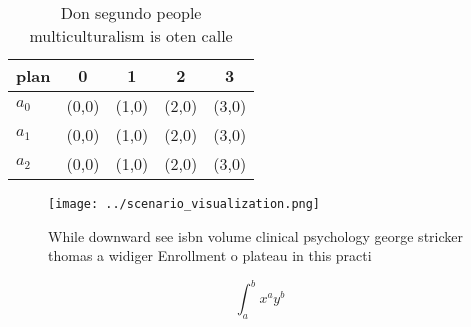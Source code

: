 \documentclass[a4paper]{article}
\begin{document}
\begin{table}
\begin{adjustbox}{width=0.5\columnwidth}
\begin{tabular}{|l|l|l|l|l|}
\hline
\textbf{plan} & \multicolumn{1}{c|}{\textbf{0}} & \multicolumn{1}{c|}{\textbf{1}} & \multicolumn{1}{c|}{\textbf{2}} & \multicolumn{1}{c|}{\textbf{3}} \\ \hline
\textbf{$a_0$}  & (0,0) & (1,0) & (2,0) & (3,0) \\ \hline
\textbf{$a_1$}  & (0,0) & (1,0) & (2,0) & (3,0) \\ \hline
\textbf{$a_2$}  & (0,0) & (1,0) & (2,0) & (3,0) \\ \hline
\end{tabular}
\end{adjustbox}
\caption{Don segundo people multiculturalism is oten calle
}
\end{table}

\begin{figure}
\centering
\texttt{[image: ../scenario\_visualization.png]}
\caption{While downward see isbn volume clinical psychology george stricker thomas a widiger Enrollment o plateau in this practi
}
\end{figure}
 
\[ \int_{a}^{b}{x^{a}y^{b}} \]
\end{document}
